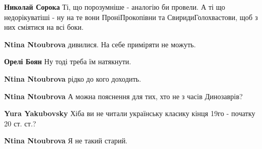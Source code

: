 \begin{itemize}
\begin{itemize}
\textbf{Николай Сорока} Ті, що порозумніше - аналогію би провели. А ті що
недорікуватіші - ну на те вони ПроніПрокопівни та СвиридиГолохвастови, щоб з
них сміятися на всі боки. \Laughey[1.0][white]

 
\textbf{Ntina Ntoubrova} дивилися. На себе приміряти не можуть.

 
\textbf{Орелі Боян} Ну тоді треба їм натякнути.

 
\textbf{Ntina Ntoubrova} рідко до кого доходить.

 
\textbf{Ntina Ntoubrova} А можна пояснення для тих, хто не з часів Динозаврів?

 
\textbf{Yura Yakubovsky} Хіба ви не читали українську класику кінця 19го - початку 20 ст. ст.?

 
\textbf{Ntina Ntoubrova} Я не такий старий.
\end{itemize}


\end{itemize}
